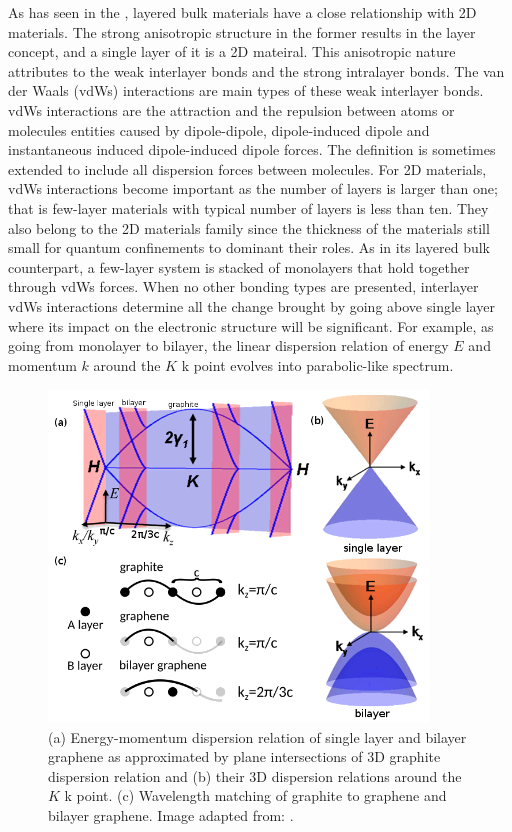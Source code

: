 As has seen in the , layered bulk materials have a close relationship with 2D materials. The strong anisotropic structure in the former results in the layer concept, and a single layer of it is a 2D mateiral. This anisotropic nature attributes to the weak interlayer bonds and the strong intralayer bonds. The van der Waals (vdWs) interactions \cite{vdws} are main types of these weak interlayer bonds. vdWs interactions are the attraction and the repulsion between atoms or molecules entities caused by dipole-dipole, dipole-induced dipole and instantaneous induced dipole-induced dipole forces. The definition is sometimes extended to include all dispersion forces between molecules.  For 2D materials, vdWs interactions become important as the number of layers is larger than one; that is few-layer materials with typical number of layers is less than ten. They also belong to the 2D materials family since the thickness of the materials still small for quantum confinements to dominant their roles. As in its layered bulk counterpart, a few-layer system is stacked of monolayers that hold together through vdWs forces. When no other bonding types are presented, interlayer vdWs interactions determine all the change brought by going above single layer where its impact on the electronic structure will be significant. For example, as going from monolayer to bilayer, the linear dispersion relation of energy $E$ and momentum $k$ around the $K$ k point evolves into parabolic-like spectrum\cite{Partoens2006,Mak2010}. 

\begin{figure}[htbp!] 
\centering  
\includegraphics[width=0.9\textwidth]{gra_band.png}
\caption{(a) Energy-momentum dispersion relation of single layer and bilayer graphene as approximated by plane intersections of 3D graphite dispersion relation and (b) their 3D dispersion relations around the $K$ k point. (c) Wavelength matching of graphite to graphene and bilayer graphene. Image adapted from: \cite{Mak2010}. }  
\label{fig:gra_bands}
\end{figure} 

